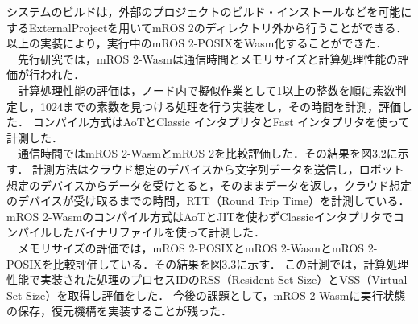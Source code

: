 システムのビルドは，外部のプロジェクトのビルド・インストールなどを可能にするExternalProjectを用いてmROS 2のディレクトリ外から行うことができる．
以上の実装により，実行中のmROS 2-POSIXをWasm化することができた．
\\　先行研究では，mROS 2-Wasmは通信時間とメモリサイズと計算処理性能の評価が行われた．
\\　計算処理性能の評価は，ノード内で擬似作業として1以上の整数を順に素数判定し，1024までの素数を見つける処理を行う実装をし，その時間を計測，評価した．
コンパイル方式はAoTとClassic インタプリタとFast インタプリタを使って計測した．
\\　通信時間ではmROS 2-WasmとmROS 2を比較評価した．その結果を図3.2に示す．
計測方法はクラウド想定のデバイスから文字列データを送信し，ロボット想定のデバイスからデータを受けとると，そのままデータを返し，クラウド想定のデバイスが受け取るまでの時間，RTT（Round Trip Time）を計測している．mROS 2-Wasmのコンパイル方式はAoTとJITを使わずClassicインタプリタでコンパイルしたバイナリファイルを使って計測した．
\\　メモリサイズの評価では，mROS 2-POSIXとmROS 2-WasmとmROS 2-POSIXを比較評価している．その結果を図3.3に示す．
この計測では，計算処理性能で実装された処理のプロセスIDのRSS（Resident Set Size）とVSS（Virtual Set Size）を取得し評価をした．
今後の課題として，mROS 2-Wasmに実行状態の保存，復元機構を実装することが残った．
